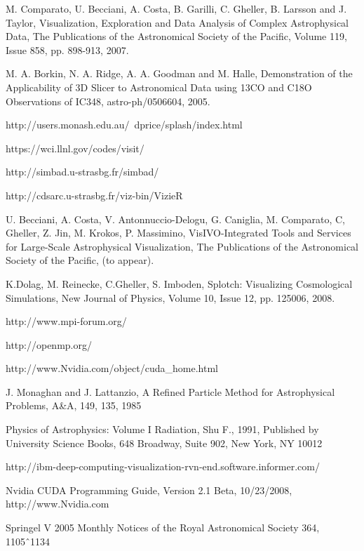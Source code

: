 \documentclass[1p,times]{elsarticle}
\begin{document}
\begin{thebibliography}{00}
M. Comparato, U. Becciani, A. Costa, B. Garilli, C. Gheller, B. Larsson and J. Taylor, Visualization, Exploration and Data Analysis of Complex Astrophysical Data,  The Publications of the Astronomical Society of the Pacific, Volume 119, Issue 858, pp. 898-913, 2007.

 M. A. Borkin, N. A. Ridge, A. A. Goodman and M. Halle, Demonstration of the Applicability of 3D Slicer to Astronomical Data using 13CO and C18O Observations of IC348, astro-ph/0506604, 2005.

 http://users.monash.edu.au/~dprice/splash/index.html

 https://wci.llnl.gov/codes/visit/

 http://simbad.u-strasbg.fr/simbad/

 http://cdsarc.u-strasbg.fr/viz-bin/VizieR

U. Becciani, A. Costa, V. Antonnuccio-Delogu, G. Caniglia, M. Comparato, C, Gheller, Z. Jin, M. Krokos, P. Massimino, VisIVO-Integrated Tools and Services for Large-Scale Astrophysical Visualization, The Publications of the Astronomical Society of the Pacific, (to appear).

K.Dolag, M. Reinecke, C.Gheller, S. Imboden, Splotch: Visualizing Cosmological Simulations, New Journal of Physics, Volume 10, Issue 12, pp. 125006, 2008.

 http://www.mpi-forum.org/

 http://openmp.org/

 http://www.Nvidia.com/object/cuda\_home.html

 J. Monaghan and J. Lattanzio, A Refined Particle Method for Astrophysical Problems, A\&A, 149, 135, 1985

 Physics of Astrophysics: Volume I Radiation, Shu F., 1991,
Published by University Science Books, 648 Broadway, Suite 902, New York, NY 10012

 http://ibm-deep-computing-visualization-rvn-end.software.informer.com/

 Nvidia CUDA Programming Guide, Version 2.1 Beta, 10/23/2008, http://www.Nvidia.com

 Springel V 2005 Monthly Notices of the Royal Astronomical Society 364, 1105ˆ1134

\end{thebibliography}
\end{document}

